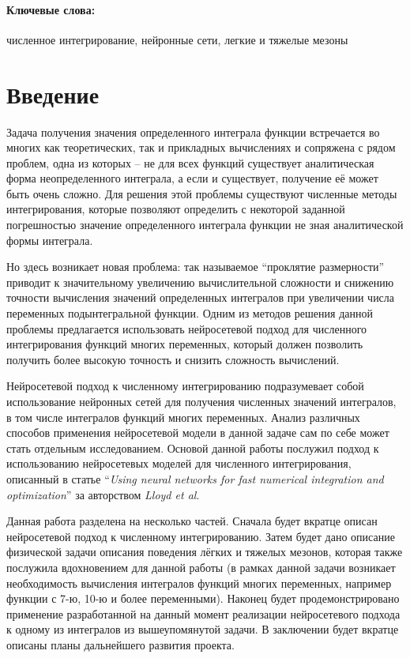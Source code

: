 \documentclass[a4paper,12pt]{article} %
\begin{document}
\paragraph{Ключевые слова:}численное интегрирование, нейронные сети, легкие и тяжелые мезоны

\section{Введение}

Задача получения значения определенного интеграла функции встречается во многих как теоретических, так и прикладных вычислениях и сопряжена с рядом проблем, одна из которых -- не для всех функций существует аналитическая форма неопределенного интеграла, а если и существует, получение её может быть очень сложно. Для решения этой проблемы существуют численные методы интегрирования, которые позволяют определить с некоторой заданной погрешностью значение определенного интеграла функции не зная аналитической формы интеграла.

Но здесь возникает новая проблема: так называемое \enquote{проклятие размерности} приводит к значительному увеличению вычислительной сложности и снижению точности вычисления значений определенных интегралов при увеличении числа переменных подынтегральной функции. Одним из методов решения данной проблемы предлагается использовать нейросетевой подход для численного интегрирования функций многих переменных, который должен позволить получить более высокую точность и снизить сложность вычислений. 

Нейросетевой подход к численному интегрированию подразумевает собой использование нейронных сетей для получения численных значений интегралов, в том числе интегралов функций многих переменных. Анализ различных способов применения нейросетевой модели в данной задаче сам по себе может стать отдельным исследованием. Основой данной работы послужил подход к использованию нейросетевых моделей для численного интегрирования, описанный в статье \enquote{\textit{Using neural networks for fast numerical integration and optimization}} за авторством \textit{Lloyd et al}. \cite{lloyd2020using}

Данная работа разделена на несколько частей. Сначала будет вкратце описан нейросетевой подход к численному интегрированию. Затем будет дано описание физической задачи описания поведения лёгких и тяжелых мезонов, которая также послужила вдохновением для данной работы (в рамках данной задачи возникает необходимость вычисления интегралов функций многих переменных, например функции с 7-ю, 10-ю и более переменными). Наконец будет продемонстрировано применение разработанной на данный момент реализации нейросетевого подхода к одному из интегралов из вышеупомянутой задачи. В заключении будет вкратце описаны планы дальнейшего развития проекта.
\end{document}
